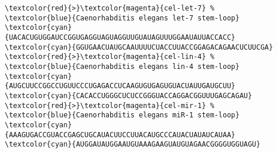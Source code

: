 \documentclass{article}
\begin{document}
\pagestyle{empty}
\begin{Verbatim}[frame=single,commentchar=\%]
\textcolor{red}{>}\textcolor{magenta}{cel-let-7} %
\textcolor{blue}{Caenorhabditis elegans let-7 stem-loop}
\textcolor{cyan}{UACACUGUGGAUCCGGUGAGGUAGUAGGUUGUAUAGUUUGGAAUAUUACCACC}
\textcolor{cyan}{GGUGAACUAUGCAAUUUUCUACCUUACCGGAGACAGAACUCUUCGA}
\textcolor{red}{>}\textcolor{magenta}{cel-lin-4} %
\textcolor{blue}{Caenorhabditis elegans lin-4 stem-loop}
\textcolor{cyan}{AUGCUUCCGGCCUGUUCCCUGAGACCUCAAGUGUGAGUGUACUAUUGAUGCUU}
\textcolor{cyan}{CACACCUGGGCUCUCCGGGUACCAGGACGGUUUGAGCAGAU}
\textcolor{red}{>}\textcolor{magenta}{cel-mir-1} %
\textcolor{blue}{Caenorhabditis elegans miR-1 stem-loop}
\textcolor{cyan}{AAAGUGACCGUACCGAGCUGCAUACUUCCUUACAUGCCCAUACUAUAUCAUAA}
\textcolor{cyan}{AUGGAUAUGGAAUGUAAAGAAGUAUGUAGAACGGGGUGGUAGU}
\end{Verbatim}
\end{document}
